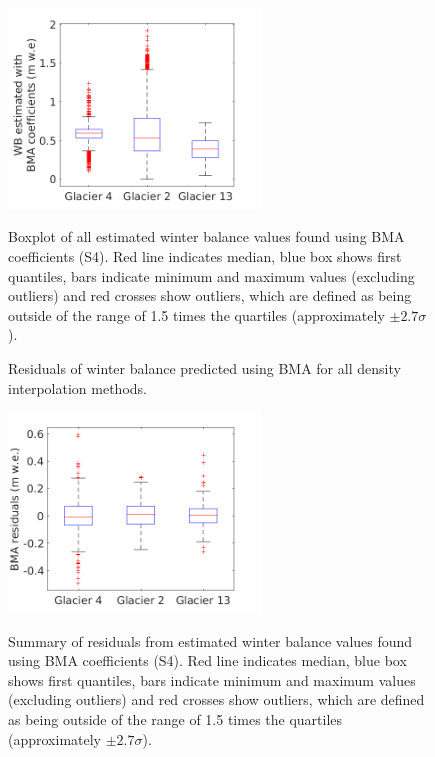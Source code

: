 \documentclass{sfuthesis}
\newcommand{\boxMatlab}{Red line indicates median, blue box shows first quantiles, bars indicate minimum and maximum values (excluding outliers) and red crosses show outliers, which are defined as being outside of the range of 1.5 times the quartiles (approximately $\pm2.7\sigma$). }
\begin{document}
\begin{figure}[H]
\centering
	\includegraphics[width =0.6\textwidth]{ModelledSWE_box_BMS.png}\\
\caption[Boxplot of all estimated winter balance values found using BMA coefficients (S4)]{Boxplot of all estimated winter balance values found using BMA coefficients (S4). \boxMatlab}
\label{fig:BMAsweboxplot}
\end{figure} 

\begin{figure}[H]
	\caption{Residuals of winter balance predicted using BMA for all density interpolation methods.}
	\label{fig:BMSresiduals_all}
\end{figure}

\begin{figure}[H]
\centering
	\includegraphics[width =0.6\textwidth]{residuals_box_BMS.png}\\
\caption[Summary of residuals from estimated winter balance values found using BMA coefficients (S4)]{Summary of residuals from estimated winter balance values found using BMA coefficients (S4). \boxMatlab}
\label{fig:BMAresidualsboxplot}
\end{figure} 
\end{document}
